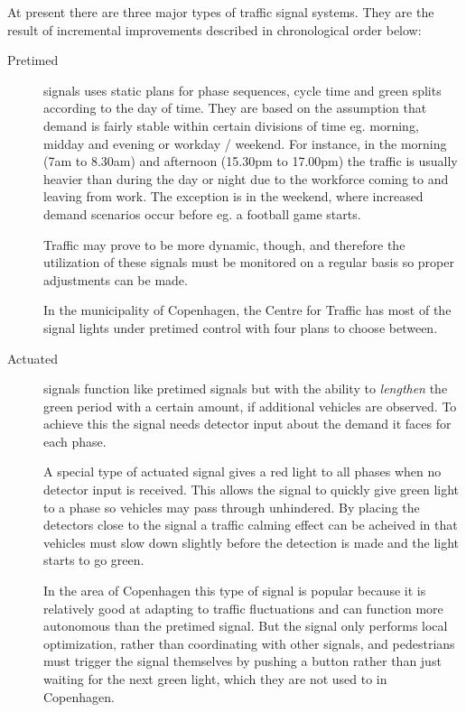 \label{signal_types}

At present there are three major types of traffic signal systems. They are the result of incremental improvements described in chronological order below:

\begin{description}
\item[Pretimed] signals uses static plans for phase sequences, cycle time and green splits according to the day of time. 
\label{pretimed}
They are based on the assumption that demand is fairly stable within certain divisions of time eg. morning, midday and evening or workday / weekend. For instance, in the morning (7am to 8.30am) and afternoon (15.30pm to 17.00pm) the traffic is usually heavier than during the day or night due to the workforce coming to and leaving from work. The exception is in the weekend, where increased demand scenarios occur before eg. a football game starts.

Traffic may prove to be more dynamic, though, and therefore the utilization of these signals must be monitored on a regular basis so proper adjustments can be made.

In the municipality of Copenhagen, the Centre for Traffic has most of the signal lights under pretimed control with four plans to choose between.
\item[Actuated] signals function like pretimed signals but with the ability to \textit{lengthen} the green period with a certain amount, if additional vehicles are observed. 
\label{actuated}
To achieve this the signal needs detector input about the demand it faces for each phase.

A special type of actuated signal gives a red light to all phases when no detector input is received. This allows the signal to quickly give green light to a phase so vehicles may pass through unhindered. By placing the detectors close to the signal a traffic calming effect can be acheived in that vehicles must slow down slightly before the detection is made and the light starts to go green.

In the area of Copenhagen this type of signal is popular because it is relatively good at adapting to traffic fluctuations and can function more autonomous than the pretimed signal. But the signal only performs local optimization, rather than coordinating with other signals, and pedestrians must trigger the signal themselves by pushing a button rather than just waiting for the next green light, which they are not used to in Copenhagen.


\end{description}

